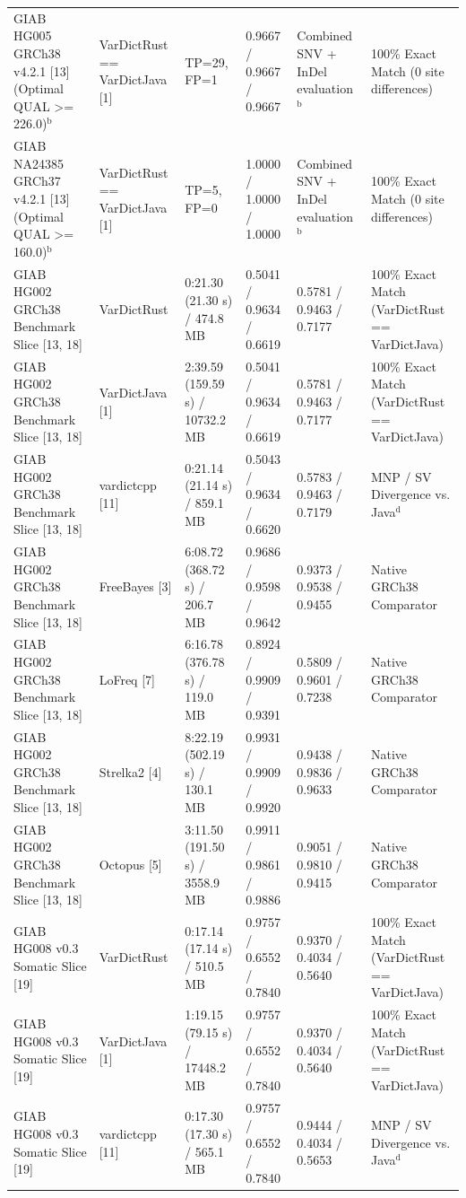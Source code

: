 \begin{table}[htbp]
{\begin{tabular}{llllll}
GIAB HG005 GRCh38 v4.2.1 [13] (Optimal QUAL \textgreater{}= 226.0)$^{\text{b}}$ & VarDictRust == VarDictJava [1] & TP=29, FP=1 & 0.9667 / 0.9667 / 0.9667 & Combined SNV + InDel evaluation$^{\text{b}}$ & 100\% Exact Match (0 site differences) \\
GIAB NA24385 GRCh37 v4.2.1 [13] (Optimal QUAL \textgreater{}= 160.0)$^{\text{b}}$ & VarDictRust == VarDictJava [1] & TP=5, FP=0 & 1.0000 / 1.0000 / 1.0000 & Combined SNV + InDel evaluation$^{\text{b}}$ & 100\% Exact Match (0 site differences) \\
GIAB HG002 GRCh38 Benchmark Slice [13, 18] & VarDictRust & 0:21.30 (21.30 s) / 474.8 MB & 0.5041 / 0.9634 / 0.6619 & 0.5781 / 0.9463 / 0.7177 & 100\% Exact Match (VarDictRust == VarDictJava) \\
GIAB HG002 GRCh38 Benchmark Slice [13, 18] & VarDictJava [1] & 2:39.59 (159.59 s) / 10732.2 MB & 0.5041 / 0.9634 / 0.6619 & 0.5781 / 0.9463 / 0.7177 & 100\% Exact Match (VarDictRust == VarDictJava) \\
GIAB HG002 GRCh38 Benchmark Slice [13, 18] & vardictcpp [11] & 0:21.14 (21.14 s) / 859.1 MB & 0.5043 / 0.9634 / 0.6620 & 0.5783 / 0.9463 / 0.7179 & MNP / SV Divergence vs. Java$^{\text{d}}$ \\
GIAB HG002 GRCh38 Benchmark Slice [13, 18] & FreeBayes [3] & 6:08.72 (368.72 s) / 206.7 MB & 0.9686 / 0.9598 / 0.9642 & 0.9373 / 0.9538 / 0.9455 & Native GRCh38 Comparator \\
GIAB HG002 GRCh38 Benchmark Slice [13, 18] & LoFreq [7] & 6:16.78 (376.78 s) / 119.0 MB & 0.8924 / 0.9909 / 0.9391 & 0.5809 / 0.9601 / 0.7238 & Native GRCh38 Comparator \\
GIAB HG002 GRCh38 Benchmark Slice [13, 18] & Strelka2 [4] & 8:22.19 (502.19 s) / 130.1 MB & 0.9931 / 0.9909 / 0.9920 & 0.9438 / 0.9836 / 0.9633 & Native GRCh38 Comparator \\
GIAB HG002 GRCh38 Benchmark Slice [13, 18] & Octopus [5] & 3:11.50 (191.50 s) / 3558.9 MB & 0.9911 / 0.9861 / 0.9886 & 0.9051 / 0.9810 / 0.9415 & Native GRCh38 Comparator \\
GIAB HG008 v0.3 Somatic Slice [19] & VarDictRust & 0:17.14 (17.14 s) / 510.5 MB & 0.9757 / 0.6552 / 0.7840 & 0.9370 / 0.4034 / 0.5640 & 100\% Exact Match (VarDictRust == VarDictJava) \\
GIAB HG008 v0.3 Somatic Slice [19] & VarDictJava [1] & 1:19.15 (79.15 s) / 17448.2 MB & 0.9757 / 0.6552 / 0.7840 & 0.9370 / 0.4034 / 0.5640 & 100\% Exact Match (VarDictRust == VarDictJava) \\
GIAB HG008 v0.3 Somatic Slice [19] & vardictcpp [11] & 0:17.30 (17.30 s) / 565.1 MB & 0.9757 / 0.6552 / 0.7840 & 0.9444 / 0.4034 / 0.5653 & MNP / SV Divergence vs. Java$^{\text{d}}$ \\

\end{tabular}}
\end{table}
